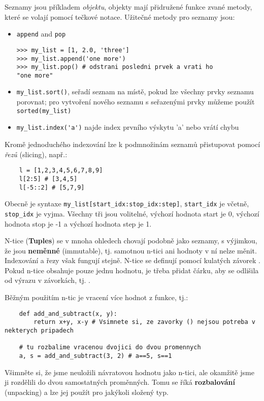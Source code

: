 Seznamy jsou příkladem \emph{objektu}, objekty mají přidružené funkce zvané metody, které se volají pomocí tečkové notace. Užitečné metody pro seznamy jsou:
\begin{itemize}
    \item \verb|append| and \verb|pop|
\begin{lstlisting}
>>> my_list = [1, 2.0, 'three']
>>> my_list.append('one more')
>>> my_list.pop() # odstrani posledni prvek a vrati ho
"one more"
\end{lstlisting}
    \item \verb|my_list.sort()|, seřadí seznam na místě, pokud lze všechny prvky seznamu porovnat; pro vytvoření nového seznamu s seřazenými prvky můžeme použít \verb|sorted(my_list)|
    \item \verb|my_list.index('a')| najde index prvního výskytu 'a' nebo vrátí chybu
\end{itemize}

Kromě jednoduchého indexování lze k podmnožinám seznamů přistupovat pomocí \emph{řezů} (slicing), např.:
\begin{lstlisting}
    l = [1,2,3,4,5,6,7,8,9]
    l[2:5] # [3,4,5]
    l[-5::2] # [5,7,9]
\end{lstlisting}
Obecně je syntaxe \verb|my_list[start_idx:stop_idx:step]|, \verb|start_idx| je včetně, \verb|stop_idx| je vyjma. Všechny tři jsou volitelné, výchozí hodnota start je 0, výchozí hodnota stop je -1 a výchozí hodnota step je 1.

N-tice (\textbf{Tuples}) se v mnoha ohledech chovají podobně jako seznamy, s výjimkou, že jsou \textbf{neměnné} (immutable), tj. samotnou n-tici ani hodnoty v ní nelze měnit. Indexování a řezy však fungují stejně. N-tice se definují pomocí kulatých závorek \ls{()}. Pokud n-tice obsahuje pouze jednu hodnotu, je třeba přidat čárku, aby se odlišila od výrazu v závorkách, tj. .

Běžným použitím n-tic je vracení více hodnot z funkce, tj.:
\begin{lstlisting}
    def add_and_subtract(x, y):
        return x+y, x-y # Vsimnete si, ze zavorky () nejsou potreba v nekterych pripadech

    # tu rozbalime vracenou dvojici do dvou promennych
    a, s = add_and_subtract(3, 2) # a==5, s==1
\end{lstlisting}
Všimněte si, že jsme neuložili návratovou hodnotu jako n-tici, ale okamžitě jsme ji rozdělili do dvou samostatných proměnných. Tomu se říká \textbf{rozbalování} (unpacking) a lze jej použít pro jakýkoli složený typ.

